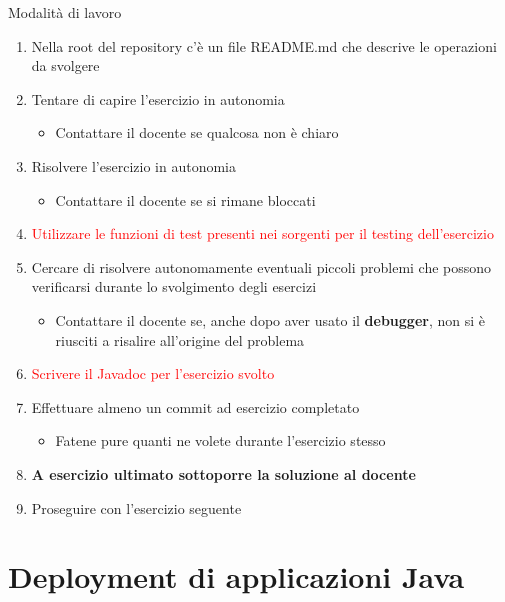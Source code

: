 \documentclass[presentation]{beamer}
\begin{document}
\begin{frame}{Modalità di lavoro}
	\begin{enumerate}
		\item Nella root del repository c'è un file README.md che descrive le operazioni da svolgere
		\item Tentare di capire l'esercizio in autonomia
		\begin{itemize}
			\item Contattare il docente se qualcosa non è chiaro
		\end{itemize}
		\item Risolvere l'esercizio in autonomia
		\begin{itemize}
			\item Contattare il docente se si rimane bloccati
		\end{itemize}
		\item \textcolor{red}{Utilizzare le funzioni di test presenti nei sorgenti per il testing dell'esercizio}
		\item Cercare di risolvere autonomamente eventuali piccoli problemi che possono verificarsi durante lo svolgimento degli esercizi
		\begin{itemize}
			\item Contattare il docente se, anche dopo aver usato il \textbf{debugger}, non si è riusciti a risalire all'origine del problema
		\end{itemize}
		\item \textcolor{red}{Scrivere il Javadoc per l'esercizio svolto} 
		\item Effettuare almeno un commit ad esercizio completato
		\begin{itemize}
			\item Fatene pure quanti ne volete durante l'esercizio stesso
		\end{itemize}
		\item \textbf{A esercizio ultimato sottoporre la soluzione al docente}
		\item Proseguire con l'esercizio seguente
	\end{enumerate}
\end{frame}

\section{Deployment di applicazioni Java}
\end{document}

